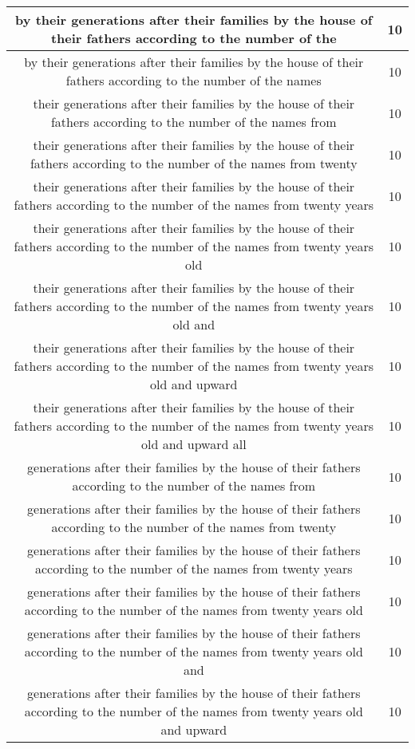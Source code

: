 \begin{center}
\begin{longtable}{|c|c|}
by their generations after their families by the house of their fathers according to the number of the & 10\\ \hline 
by their generations after their families by the house of their fathers according to the number of the names & 10\\ \hline 
their generations after their families by the house of their fathers according to the number of the names from & 10\\ \hline 
their generations after their families by the house of their fathers according to the number of the names from twenty & 10\\ \hline 
their generations after their families by the house of their fathers according to the number of the names from twenty years & 10\\ \hline 
their generations after their families by the house of their fathers according to the number of the names from twenty years old & 10\\ \hline 
their generations after their families by the house of their fathers according to the number of the names from twenty years old and & 10\\ \hline 
their generations after their families by the house of their fathers according to the number of the names from twenty years old and upward & 10\\ \hline 
their generations after their families by the house of their fathers according to the number of the names from twenty years old and upward all & 10\\ \hline 
generations after their families by the house of their fathers according to the number of the names from & 10\\ \hline 
generations after their families by the house of their fathers according to the number of the names from twenty & 10\\ \hline 
generations after their families by the house of their fathers according to the number of the names from twenty years & 10\\ \hline 
generations after their families by the house of their fathers according to the number of the names from twenty years old & 10\\ \hline 
generations after their families by the house of their fathers according to the number of the names from twenty years old and & 10\\ \hline 
generations after their families by the house of their fathers according to the number of the names from twenty years old and upward & 10\\ \hline 

\end{longtable}
\end{center}
